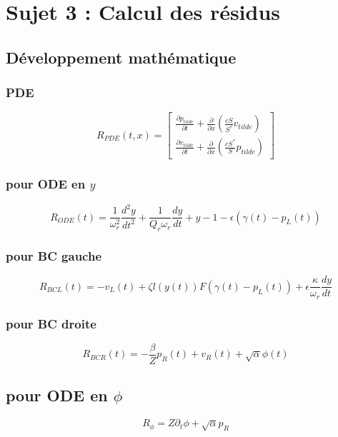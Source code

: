 \documentclass[12pt,a4paper]{article}
\begin{document}
\newpage
\section{Sujet 3 : Calcul des résidus}


\subsection{Développement mathématique}

\subsubsection{PDE}
\begin{equation}
    R_{PDE}(t,x) = \begin{bmatrix}
        \frac{\partial p_{tilde}}{\partial t} + \frac{\partial}{\partial x}\left(\frac{cS}{S^*} v_{tilde}\right) \\
        \frac{\partial v_{tilde}}{\partial t} + \frac{\partial}{\partial x}\left(\frac{cS^*}{S} p_{tilde}\right)
    \end{bmatrix}
\end{equation}

\subsubsection{pour ODE en $y$}
\begin{equation}
    R_{ODE}(t) = \frac{1}{\omega_r^2} \frac{d^2 y}{dt^2} + \frac{1}{Q_r \omega_r} \frac{dy}{dt} + y - 1 - \epsilon (\gamma(t) - p_L(t))
\end{equation}

\subsubsection{pour BC gauche}
\begin{equation}
    R_{BCL}(t) = -v_L(t) + \zeta l(y(t)) F(\gamma(t) - p_L(t)) + \epsilon \frac{\kappa}{\omega_r} \frac{dy}{dt}
\end{equation}

\subsubsection{pour BC droite}
\begin{equation}
    R_{BCR}(t) = -\frac{\beta}{Z} p_R(t) + v_R(t) + \sqrt{\alpha} \phi(t)
\end{equation}

\subsection{pour ODE en $\phi$}
\begin{equation}
    R_{\phi}=Z\partial_t \phi + \sqrt{\alpha} p_R
\end{equation}
\end{document}
